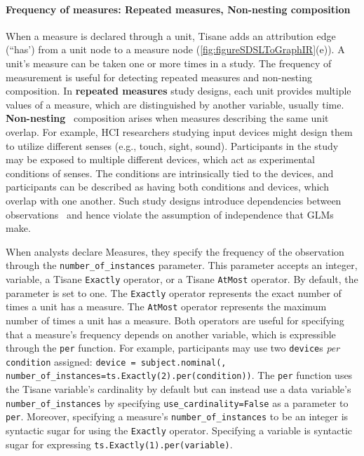 \paragraph{Frequency of measures: Repeated measures, Non-nesting composition}
\def\numberofinstances{\texttt{number\_of\_instances}\xspace}
When a measure is declared through a unit, Tisane adds an
attribution edge (``has') from a unit node to a measure node (\ref{fig:figureSDSLToGraphIR}(e)).
A unit's measure can be taken one or more times in a study. The frequency of
measurement is useful for detecting repeated measures and non-nesting
composition. In \textbf{repeated measures} study designs, each unit provides
multiple values of a measure, which are distinguished by another variable,
usually time. \textbf{Non-nesting}~\cite{gelmanHill2006regression} composition
arises when measures describing the same unit overlap. For example, HCI researchers studying input devices might
design them to utilize different senses (e.g., touch, sight, sound).
Participants in the study may be exposed to multiple different devices, which
act as experimental conditions of senses. The conditions are intrinsically tied to the
devices, and participants can be described as having both conditions and
devices, which overlap with one another. Such study designs
introduce dependencies between observations~\cite{clark1973language} and hence
violate the assumption of independence that GLMs make.

\def\inputdevice{\texttt{device}\xspace} When analysts declare Measures, they
specify the frequency of the observation through the
\texttt{number\_of\_instances} parameter. This parameter accepts an integer,
variable, a Tisane \texttt{Exactly} operator, or a Tisane \texttt{AtMost}
operator. By default, the parameter is set to one. The \texttt{Exactly} operator
represents the exact number of times a unit has a measure. The \texttt{AtMost}
operator represents the maximum number of times a unit has a measure. Both
operators are useful for specifying that a measure's frequency depends on
another variable, which is expressible through the \texttt{per} function. For
example, participants may use two \inputdevice{}s \textit{per}
\texttt{condition} assigned: \texttt{device = subject.nominal(, number\_of\_instances=ts.Exactly(2).per(condition))}. The \texttt{per}
function uses the Tisane variable's cardinality by default but can instead use a
data variable's \numberofinstances by specifying \texttt{use\_cardinality=False}
as a parameter to \texttt{per}. Moreover, specifying a measure's
\texttt{number\_of\_instances} to be an integer is syntactic sugar for using the
\texttt{Exactly} operator. Specifying a variable is syntactic sugar for
expressing \texttt{ts.Exactly(1).per(variable)}.

